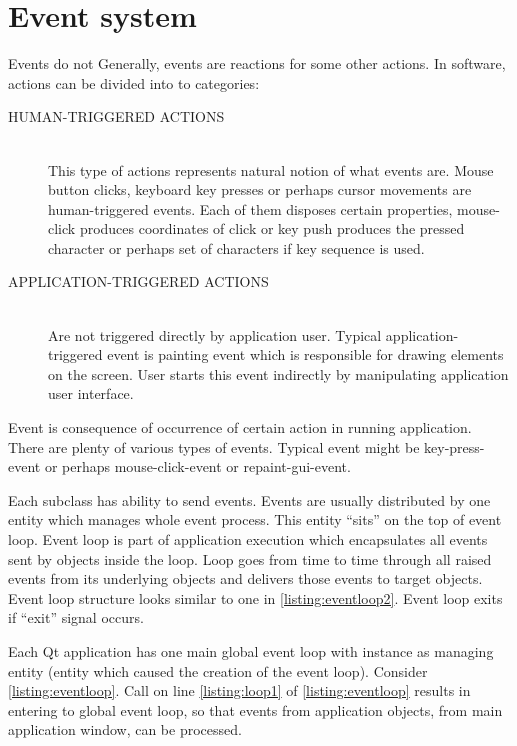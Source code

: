 \chapter{Event system}\label{section:events}
Events do not  Generally, events are reactions for some other actions. In software, actions can be divided into to categories:
\begin{description}
\item[HUMAN-TRIGGERED ACTIONS] \hfill \\
This type of actions represents natural notion of what events are. Mouse button clicks, keyboard key presses or perhaps cursor movements are human-triggered events. Each of them disposes certain properties, \eg mouse-click produces coordinates of click or key push produces the pressed character or perhaps set of characters if key sequence is used.
\item[APPLICATION-TRIGGERED ACTIONS]  \hfill \\
Are not triggered directly by application user. Typical application-triggered event is painting event which is responsible for drawing  elements on the screen. User starts this event indirectly by manipulating application user interface.
\end{description}

Event is consequence of occurrence of certain action in running application. There are plenty of various types of events. Typical event might be key-press-event or perhaps mouse-click-event or repaint-gui-event.

Each subclass has ability to send events. Events are usually distributed by one entity which manages whole event process. This entity \enquote{sits} on the top of event loop. Event loop is part of application execution which encapsulates all events sent by objects inside the loop. Loop goes from time to time through all raised events from its underlying objects and delivers those events to target objects. Event loop structure looks similar to one in \autoref{listing:eventloop2}. Event loop exits if \enquote{exit} signal occurs.

Each Qt application has one main global event loop with instance as managing entity (entity which caused the creation of the event loop). Consider \autoref{listing:eventloop}. Call on line \ref{listing:loop1} of \autoref{listing:eventloop} results in entering to global event loop, so that events from application objects, \eg from main application window, can be processed.


